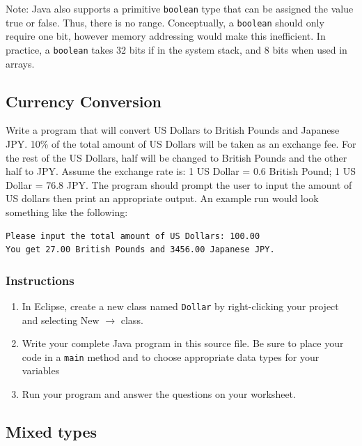 \documentclass[12pt]{scrartcl}
\begin{document}
Note: Java also supports a primitive \texttt{boolean} type 
that can be assigned the value true or false.  Thus, there is no range.  
Conceptually, a \texttt{boolean} should only require one bit, 
however memory addressing would make this inefficient.  In practice, 
a \texttt{boolean} takes 32 bits if in the system stack, and 8
bits when used in arrays.
 
\subsection{Currency Conversion}

Write a program that will convert US Dollars to British Pounds and 
Japanese JPY.  10\% of the total amount of US Dollars will be taken 
as an exchange fee.  For the rest of the US Dollars, half will be 
changed to British Pounds and the other half to JPY.  Assume the 
exchange rate is: 1 US Dollar = 0.6 British Pound; 1 US Dollar = 
76.8 JPY.  The program should prompt the user to input the amount 
of US dollars then print an appropriate output.  An example run 
would look something like the following:

\begin{verbatim}
Please input the total amount of US Dollars: 100.00
You get 27.00 British Pounds and 3456.00 Japanese JPY.
\end{verbatim}

\subsubsection*{Instructions}

\begin{enumerate}
  \item In Eclipse, create a new class named \texttt{Dollar}
  	by right-clicking your project and selecting New $\rightarrow$ class.
  \item Write your complete Java program in this source file.  Be sure to
  	place your code in a \texttt{main} method and 
	to choose appropriate data types for your variables
  \item Run your program and answer the questions on your worksheet.
\end{enumerate} 

\subsection{Mixed types}
\end{document}
